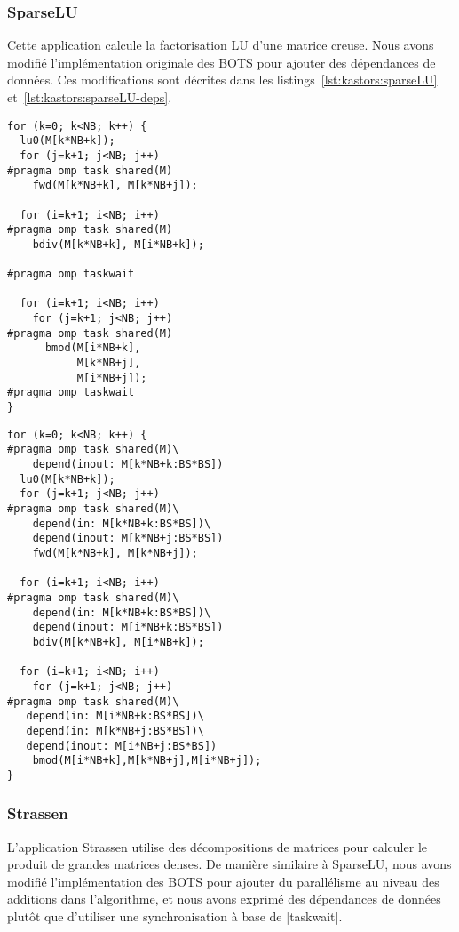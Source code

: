 \subsubsection{SparseLU}\label{sec:kastors:sparselu}

Cette application calcule la factorisation LU d'une matrice creuse.
Nous avons modifié l'implémentation originale des BOTS pour ajouter des dépendances de données.
Ces modifications sont décrites dans les listings~\ref{lst:kastors:sparseLU} et~\ref{lst:kastors:sparseLU-deps}.

\begin{lstlisting}[caption=LU utilisant des tâches indépendantes,label=lst:kastors:sparseLU]
for (k=0; k<NB; k++) {
  lu0(M[k*NB+k]);
  for (j=k+1; j<NB; j++)
#pragma omp task shared(M)
    fwd(M[k*NB+k], M[k*NB+j]);

  for (i=k+1; i<NB; i++)
#pragma omp task shared(M)
    bdiv(M[k*NB+k], M[i*NB+k]);

#pragma omp taskwait

  for (i=k+1; i<NB; i++)
    for (j=k+1; j<NB; j++)
#pragma omp task shared(M)
      bmod(M[i*NB+k],
           M[k*NB+j],
           M[i*NB+j]);
#pragma omp taskwait
}
\end{lstlisting}

\begin{lstlisting}[caption=LU utilisant des tâches avec dépendances,label=lst:kastors:sparseLU-deps]
for (k=0; k<NB; k++) {
#pragma omp task shared(M)\
    depend(inout: M[k*NB+k:BS*BS])
  lu0(M[k*NB+k]);
  for (j=k+1; j<NB; j++)
#pragma omp task shared(M)\
    depend(in: M[k*NB+k:BS*BS])\
    depend(inout: M[k*NB+j:BS*BS])
    fwd(M[k*NB+k], M[k*NB+j]);

  for (i=k+1; i<NB; i++)
#pragma omp task shared(M)\
    depend(in: M[k*NB+k:BS*BS])\
    depend(inout: M[i*NB+k:BS*BS])
    bdiv(M[k*NB+k], M[i*NB+k]);

  for (i=k+1; i<NB; i++)
    for (j=k+1; j<NB; j++)
#pragma omp task shared(M)\
   depend(in: M[i*NB+k:BS*BS])\
   depend(in: M[k*NB+j:BS*BS])\
   depend(inout: M[i*NB+j:BS*BS])
    bmod(M[i*NB+k],M[k*NB+j],M[i*NB+j]);
}
\end{lstlisting}

\subsubsection{Strassen}\label{sec:kastors:strassen}

L'application Strassen utilise des décompositions de matrices pour calculer le produit de grandes matrices denses.
De manière similaire à SparseLU, nous avons modifié l'implémentation des BOTS pour ajouter du parallélisme au niveau des additions dans l'algorithme, et nous avons exprimé des dépendances de données plutôt que d'utiliser une synchronisation à base de |taskwait|.

